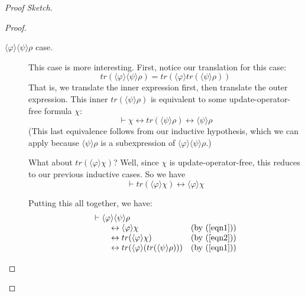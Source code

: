 \documentclass[letterpaper]{article}
\theoremstyle{definition}
\newenvironment{sketch}{\begin{proof}[Proof Sketch]}{\end{proof}}
\newcommand{\proves}{\vdash}
\newcommand{\diaHebbop}[1]{\langle #1\rangle}
\begin{document}
\begin{sketch}
\begin{proof}
\begin{description}
\begin{description}
                \item[$\diaHebbop{\varphi} \diaHebbop{\psi} \rho$ case.] This case is more interesting.  First, notice our translation for this case:
                \[
                    tr(\diaHebbop{\varphi} \diaHebbop{\psi} \rho) = 
                    tr(\diaHebbop{\varphi} tr(\diaHebbop{\psi} \rho))
                \]
                That is, we translate the inner expression first, then translate the outer expression.  This inner $tr(\diaHebbop{\psi} \rho)$ is equivalent to some update-operator-free formula $\chi$:
                \begin{equation}\label{eqn1}
                    \proves \chi 
                    \leftrightarrow 
                    tr(\diaHebbop{\psi} \rho)
                    \leftrightarrow
                    \diaHebbop{\psi} \rho
                \end{equation}
                (This last equivalence follows from our inductive hypothesis, which we can apply because $\diaHebbop{\psi} \rho$ is a subexpression of $\diaHebbop{\varphi} \diaHebbop{\psi} \rho$.)

                What about $tr(\diaHebbop{\varphi} \chi)$?  Well, since $\chi$ is update-operator-free, this reduces to our previous inductive cases.  So we have
                \begin{equation}\label{eqn2}
                    \proves tr(\diaHebbop{\varphi} \chi) \leftrightarrow \diaHebbop{\varphi} \chi
                \end{equation}

                Putting this all together, we have:
                \[
                \begin{array}{ll}
                    \proves \diaHebbop{\varphi} \diaHebbop{\psi} \rho 
                    & \\
                    
                    \quad \quad \leftrightarrow
                    \diaHebbop{\varphi} \chi
                    & (\mbox{by (\ref{eqn1})}) \\

                    \quad \quad \leftrightarrow
                    tr(\diaHebbop{\varphi} \chi)
                    & (\mbox{by (\ref{eqn2})}) \\

                    \quad \quad \leftrightarrow
                    tr(\diaHebbop{\varphi} (tr(\diaHebbop{\psi} \rho)))
                    & (\mbox{by (\ref{eqn1})}) \\


\end{array}\]
\end{description}
\end{description}
\end{proof}
\end{sketch}
\end{document}
